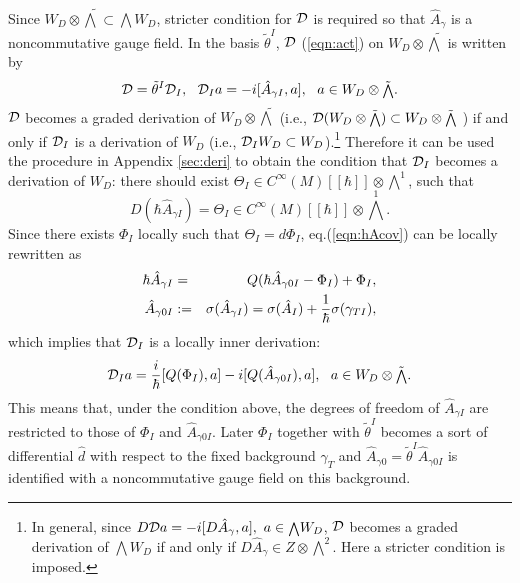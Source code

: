 \documentclass[10pt,a4paper]{article}
\def\h{\hbar}
\def\hA{{\hat A}}
\begin{document}
Since $W_D\otimes {\tilde {\scriptstyle \bigwedge}}\subset {\scriptstyle \bigwedge}W_D$, stricter condition for ${\cal D}$ is required so that $\hA_{\gamma}$ is a noncommutative gauge field.
In the basis ${\tilde\theta}^I$, ${\cal D}$ (\ref{eqn:act}) on $W_D\otimes {\tilde {\scriptstyle \bigwedge}}$ is written by
\begin{equation}
\label{eqn:caldag}
{\cal D}={\tilde \theta}^I{\cal D}_I,\ \ {\cal D}_Ia=-i[\hA_{\gamma I},a],\ \   a\in W_D\otimes {\tilde {\scriptstyle \bigwedge}}.
\end{equation}
${\cal D}$ becomes a graded derivation of $W_D\otimes {\tilde {\scriptstyle \bigwedge}}$ (i.e., ${\cal D}(W_D\otimes {\tilde {\scriptstyle \bigwedge}})\subset W_D\otimes {\tilde {\scriptstyle \bigwedge}}$ ) if and only if ${\cal D}_I$ is a derivation of $W_D$ (i.e., ${\cal D}_IW_D\subset W_D$).\footnote{
In general, since $D{\cal D}a=-i[D\hA_\gamma,a],\ a\in{\scriptstyle \bigwedge}W_D$, ${\cal D}$ becomes a graded derivation of ${\scriptstyle \bigwedge}W_D$ if and only if $D\hA_\gamma\in Z\otimes {\scriptstyle \bigwedge}^2$. Here a stricter condition is imposed.
}
Therefore it can be used the procedure in Appendix \ref{sec:deri} to obtain the condition that ${\cal D}_I$ becomes a derivation of $W_D$: there should exist $\Theta_I\in C^\infty(M)[[\h]]\otimes {\scriptstyle \bigwedge}^1$, such that
\begin{equation}
\label{eqn:hAcov}
D(\h \hA_{\gamma I})=\Theta_I\in C^\infty(M)[[\h]]\otimes {\scriptstyle \bigwedge}^1.
\end{equation}
Since there exists $\Phi_I$ locally such that $\Theta_I=d\Phi_I$, eq.(\ref{eqn:hAcov}) can be locally rewritten as
\begin{eqnarray}
\label{eqn:hAQP}
\h \hA_{\gamma I}&=&Q(\h \hA_{\gamma0I}-\Phi_I)+\Phi_I,\nonumber\\
\hA_{\gamma0I}&:=&\sigma(\hA_{\gamma I})=\sigma(\hA_I)+{1\over\h}\sigma(\gamma_{TI}),
\end{eqnarray}
which implies that ${\cal D}_I$ is a locally inner derivation:
\begin{equation}
\label{eqn:caldicov}
{\cal D}_Ia={i\over\h}[Q(\Phi_I),a]-i[Q(\hA_{\gamma0I}),a],\ \ a\in W_D\otimes {\tilde {\scriptstyle \bigwedge}}.
\end{equation}
This means that, under the condition above, the degrees of freedom of $\hA_{\gamma I}$ are restricted to those of $\Phi_I$ and $\hA_{\gamma0I}$. Later $\Phi_I$  together with ${\tilde\theta}^I$ becomes a sort of differential $\hat d$ with respect to the fixed background $\gamma_T$ and $\hA_{\gamma0}={\tilde \theta}^I\hA_{\gamma0I}$ is identified with a noncommutative gauge field on this background.\\
\end{document}
